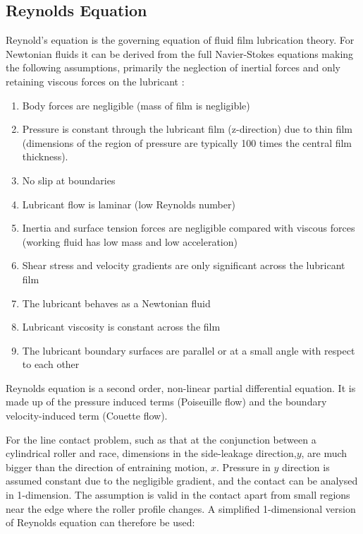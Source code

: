 \subsection{Reynolds Equation}

Reynold’s equation \cite{Reynolds1886} is the governing equation of fluid film lubrication theory. For Newtonian fluids it can be derived from the full Navier-Stokes equations making the following assumptions, primarily the neglection of inertial forces and only retaining viscous forces on the lubricant \cite{Gohar1988}:
\begin{enumerate} %
	\item Body forces are negligible (mass of film is negligible)
	\item Pressure is constant through the lubricant film (z-direction) due to thin film (dimensions of the region of pressure are typically 100 times the central film thickness).
	\item No slip at boundaries
	\item Lubricant flow is laminar (low Reynolds number)
	\item Inertia and surface tension forces are negligible compared with viscous forces (working fluid has low mass and low acceleration)
	\item Shear stress and velocity gradients are only significant across the lubricant film %
	\item The lubricant behaves as a Newtonian fluid
	\item Lubricant viscosity is constant across the film
	\item The lubricant boundary surfaces are parallel or at a small angle with respect to each other
\end{enumerate}

Reynolds equation is a second order, non-linear partial differential equation. It is made up of the pressure induced terms (Poiseuille flow) and the boundary velocity-induced term (Couette flow). 

For the line contact problem, such as that at the conjunction between a cylindrical roller and race, dimensions in the side-leakage direction,$y$, are much bigger than the direction of entraining motion, $x$. Pressure in $y$ direction is assumed constant due to the negligible gradient, and the contact can be analysed in 1-dimension. The assumption is valid in the contact apart from small regions near the edge where the roller profile changes. A simplified 1-dimensional version of Reynolds equation can therefore be used:

